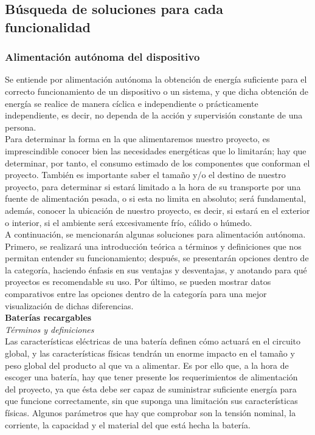 \documentclass[12pt]{article}
\begin{document}
	\subsection[Búsqueda soluciones]{Búsqueda de soluciones para cada funcionalidad}

	\subsubsection{Alimentación autónoma del dispositivo}
	\label{subseccion 3.2.1: búsqueda soluciones alimentación}
	\noindent Se entiende por alimentación autónoma la obtención de energía suficiente para el correcto funcionamiento de un dispositivo o un sistema, y que dicha obtención de energía se realice de manera cíclica e independiente o prácticamente independiente, es decir, no dependa de la acción y supervisión constante de una persona. \\
	
	\noindent Para determinar la forma en la que alimentaremos nuestro proyecto, es imprescindible conocer bien las necesidades energéticas que lo limitarán; hay que determinar, por tanto, el consumo estimado de los componentes que conforman el proyecto. También es importante saber el tamaño y/o el destino de nuestro proyecto, para determinar si estará limitado a la hora de su transporte por una fuente de alimentación pesada, o si esta no limita en absoluto; será fundamental, además, conocer la ubicación de nuestro proyecto, es decir, si estará en el exterior o interior, si el ambiente será excesivamente frío, cálido o húmedo.\\
	
	\noindent A continuación, se mencionarán algunas soluciones para alimentación autónoma. Primero, se realizará una introducción teórica a términos y definiciones que nos permitan entender su funcionamiento; después, se presentarán opciones dentro de la categoría, haciendo énfasis en sus ventajas y desventajas, y anotando para qué proyectos es recomendable su uso. Por último, se pueden mostrar datos comparativos entre las opciones dentro de la categoría para una mejor visualización de dichas diferencias.\\ 
	
	\noindent \textbf{Baterías recargables} \\
	
	\noindent \textit{Términos y definiciones} \\
	
	\noindent Las características eléctricas de una batería definen cómo actuará en el circuito global, y las características físicas tendrán un enorme impacto en el tamaño y peso global del producto al que va a alimentar. Es por ello que, a la hora de escoger una batería, hay que tener presente los requerimientos de alimentación del proyecto, ya que ésta debe ser capaz de suministrar suficiente energía para que funcione correctamente, sin que suponga una limitación sus características físicas. Algunos parámetros que hay que comprobar son la tensión nominal, la corriente, la capacidad y el material del que está hecha la batería. \\
	
\end{document}

